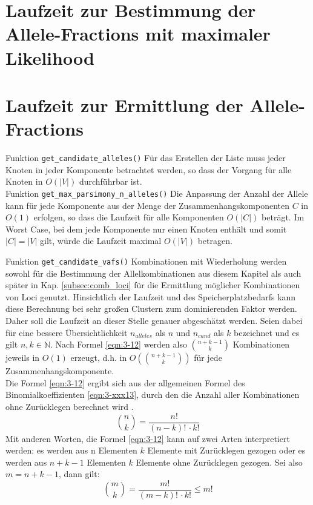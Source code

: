 \section{Laufzeit zur Bestimmung der Allele-Fractions mit maximaler Likelihood}
\section{Laufzeit zur Ermittlung der Allele-Fractions}
Funktion \lstinline|get_candidate_alleles()| 
Für das Erstellen der Liste muss jeder Knoten in jeder Komponente betrachtet werden, so dass der Vorgang für alle Knoten in $ O(|V|) $ durchführbar ist.\\

Funktion \lstinline|get_max_parsimony_n_alleles()|
Die Anpassung der Anzahl der Allele kann für jede Komponente aus der Menge der Zusammenhangskomponenten $ C $ in $ O(1) $ erfolgen, so dass die Laufzeit für alle Komponenten $ O(|C|) $ beträgt. Im Worst Case, bei dem jede Komponente nur einen Knoten enthält und somit $ |C| = |V| $ gilt, würde die Laufzeit maximal $ O(|V|) $ betragen.

Funktion \lstinline|get_candidate_vafs()| \label{subsubsec:cand_vafs}
Kombinationen mit Wiederholung werden sowohl für die Bestimmung der Allelkombinationen aus diesem Kapitel als auch später in Kap. \ref{subsec:comb_loci} für die Ermittlung möglicher Kombinationen von Loci genutzt. Hinsichtlich der Laufzeit und des Speicherplatzbedarfs kann diese Berechnung bei sehr großen Clustern zum dominierenden Faktor werden. Daher soll die Laufzeit an dieser Stelle genauer abgeschätzt werden. Seien dabei für eine bessere Übersichtlichkeit $ n_{alleles} $ als $ n $ und $ n_{cand} $ als $k$ bezeichnet und es gilt $n, k \in \mathds{N} $. Nach Formel \eqref{eqn:3-12} werden also $ \binom{n + k - 1}{k} $ Kombinationen jeweils in $O(1)$ erzeugt, d.h. in $ O(\binom{n + k - 1}{k}) $ für jede Zusammenhangskomponente. \\

Die Formel \eqref{eqn:3-12} ergibt sich aus der allgemeinen Formel des Binomialkoeffizienten \eqref{eqn:3-xxx13}, durch den die Anzahl aller Kombinationen ohne Zurücklegen berechnet wird \cite{tb_stat}. 
\begin{equation} \label{eqn:3-xxx13}
\tag{3-xxx13}
\binom{n}{k} = \frac{n!}{(n-k)!\, \cdotp k!}
\end{equation} 
Mit anderen Worten, die Formel \eqref{eqn:3-12} kann auf zwei Arten interpretiert werden: es werden aus n Elementen $ k $ Elemente mit Zurücklegen gezogen oder es werden aus $ n + k - 1 $ Elementen $ k $ Elemente ohne Zurücklegen gezogen. Sei also  $ m = n + k - 1 $, dann gilt:
\begin{equation} \label{eqn:3-xxx14}
\tag{3-xxx14}
\binom{m}{k} = \frac{m!}{(m - k)!\, \cdotp k!} \leq m!
\end{equation} 

